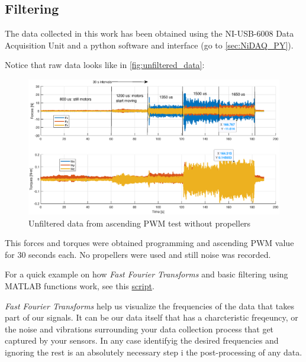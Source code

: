 \documentclass[a4paper]{article}
\begin{document}
{\begin{itemize}
\end{itemize}

\subsection{Filtering}

The data collected in this work has been obtained using the NI-USB-6008 Data Acquisition Unit and a python software and interface (go to \autoref{sec:NiDAQ_PY}).

Notice that raw data looks like in \autoref{fig:unfiltered_data}:

\begin{figure}[h!]
	\centering
	\includegraphics[width=1\textwidth]{Images/unfiltered_20230915.eps}
	\caption{Unfiltered data from ascending PWM test without propellers}
	\label{fig:unfiltered_noprops}
\end{figure}

This forces and torques were obtained programming and ascending PWM value for 30 seconds each. No propellers were used and still noise was recorded. 

For a quick example on how \textit{Fast Fourier Transforms} and basic filtering using MATLAB functions work, see this \hyperref{https://github.com/IrisDuMutel/ATIMini40_software/blob/master/MATLAB/Scripts/Examples/example_FFTandFilters.m}{category}{name}{script}.

\textit{Fast Fourier Transforms} help us visualize the frequencies of the data that takes part of our signals. It can be our data itself that has a charcteristic freqeuncy, or the noise and vibrations surrounding your data collection process that get captured by your sensors. In any case identifyig the desired frequencies and ignoring the rest is an absolutely necessary step i the post-processing of any data.

}
\end{document}
